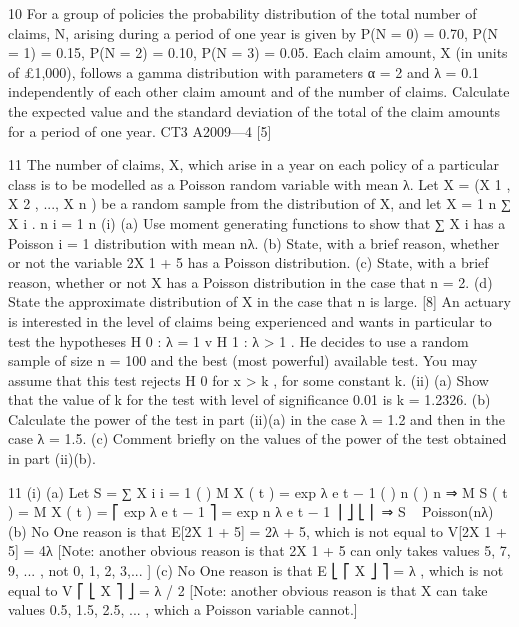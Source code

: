 \documentclass[a4paper,12pt]{article}
\begin{document}
\begin{enumerate}
10
For a group of policies the probability distribution of the total number of claims, N,
arising during a period of one year is given by
P(N = 0) = 0.70, P(N = 1) = 0.15, P(N = 2) = 0.10, P(N = 3) = 0.05.
Each claim amount, X (in units of £1,000), follows a gamma distribution with parameters α = 2 and λ = 0.1 independently of each other claim amount and of the number of claims.
Calculate the expected value and the standard deviation of the total of the claim amounts for a period of one year.
CT3 A2009—4
[5]

11
The number of claims, X, which arise in a year on each policy of a particular class is to be modelled as a Poisson random variable with mean λ. Let X = (X 1 , X 2 , ..., X n ) be a random sample from the distribution of X, and let X =
1 n
∑ X i .
n i = 1
n
(i)
(a)
Use moment generating functions to show that
∑ X i has a Poisson
i = 1
distribution with mean nλ.
(b) State, with a brief reason, whether or not the variable 2X 1 + 5 has a Poisson distribution.
(c) State, with a brief reason, whether or not X has a Poisson distribution in the case that n = 2.
(d) State the approximate distribution of X in the case that n is large.
[8]
An actuary is interested in the level of claims being experienced and wants in particular to test the hypotheses
H 0 : λ = 1 v H 1 : λ > 1 .
He decides to use a random sample of size n = 100 and the best (most powerful) available test. You may assume that this test rejects H 0 for x > k , for some constant k.
(ii)
(a) Show that the value of k for the test with level of significance 0.01 is k = 1.2326.
(b) Calculate the power of the test in part (ii)(a) in the case λ = 1.2 and then in the case λ = 1.5.
(c) Comment briefly on the values of the power of the test obtained in part
(ii)(b).
\newpage

11
(i)
(a)
Let S = ∑ X i
i = 1
{ (
) }
M X ( t ) = exp λ e t − 1
{ (
) }
n
{ (
) }
n
⇒ M S ( t ) = { M X ( t ) } = ⎡ exp λ e t − 1 ⎤ = exp n λ e t − 1
⎥ ⎦
⎣ ⎢
⇒ S ~ Poisson(nλ)
(b)
No
One reason is that E[2X 1 + 5] = 2λ + 5, which is not equal to V[2X 1 + 5] = 4λ
[Note: another obvious reason is that 2X 1 + 5 can only takes values 5,
7, 9, ... , not 0, 1, 2, 3,... ]
(c)
No
One reason is that E ⎣ ⎡ X ⎦ ⎤ = λ , which is not equal to V ⎡ ⎣ X ⎤ ⎦ = λ / 2
[Note: another obvious reason is that X can take values 0.5, 1.5, 2.5, ... , which a Poisson variable cannot.]


\end{enumerate}
\end{document}
